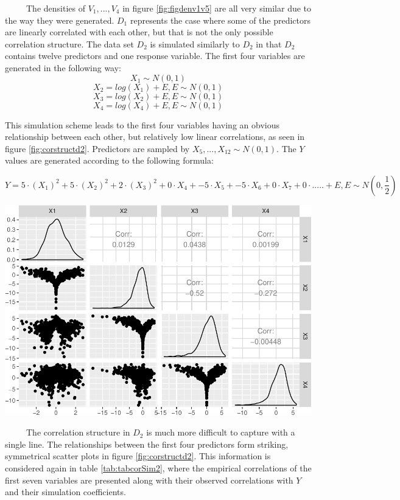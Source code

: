 \documentclass[12pt,twoside]{reedthesis}
\let\origfigure\figure
\let\endorigfigure\endfigure
\renewenvironment{figure}[1][2] {
    \expandafter\origfigure\expandafter[H]
} {
    \endorigfigure
}
\begin{document}
  ~~~~~The densities of \(V_1,...,V_4\) in figure \ref{fig:figdenv1v5} are
  all very similar due to the way they were generated. \(D_1\) represents
  the case where some of the predictors are linearly correlated with each
  other, but that is not the only possible correlation structure. The data
  set \(D_2\) is simulated similarly to \(D_2\) in that \(D_2\) contains
  twelve predictors and one response variable. The first four variables
  are generated in the following way: \[X_1 \sim N(0,1)\]
  \[X_2 = log(X_1) + E, E \sim N(0,1)\]
  \[X_3 = log(X_2) + E, E \sim N(0,1)\]
  \[X_4 = log(X_4) + E, E \sim N(0,1)\]
  
  This simulation scheme leads to the first four variables having an
  obvious relationship between each other, but relatively low linear
  correlations, as seen in figure \ref{fig:corstructd2}. Predictors are
  sampled by \(X_5,...,X_{12} \sim N(0,1)\). The \(Y\) values are
  generated according to the following formula:
  
  \[Y = 5 \cdot (X_1)^2 + 5 \cdot(X_2)^2 + 2 \cdot (X_3)^2 + 0 \cdot X_4 + -5 \cdot X_5 + -5\cdot X_6 + 0\cdot X_7 + 0 \cdot ..... + E, E \sim N(0,\frac 1 2 )\]
  
  \begin{figure}[htbp]
  \centering
  \includegraphics{Thesis_files/figure-latex/unnamed-chunk-15-1.pdf}
  \caption{\label{fig:unnamed-chunk-15}\label{fig:corstructd2}Correlation
  structure of the first four variables in D2}
  \end{figure}
  
  ~~~~~The correlation structure in \(D_2\) is much more difficult to
  capture with a single line. The relationships between the first four
  predictors form striking, symmetrical scatter plots in figure
  \ref{fig:corstructd2}. This information is considered again in table
  \ref{tab:tabcorSim2}, where the empirical correlations of the first
  seven variables are presented along with their observed correlations
  with \(Y\) and their simulation coefficients.
  
\end{document}
